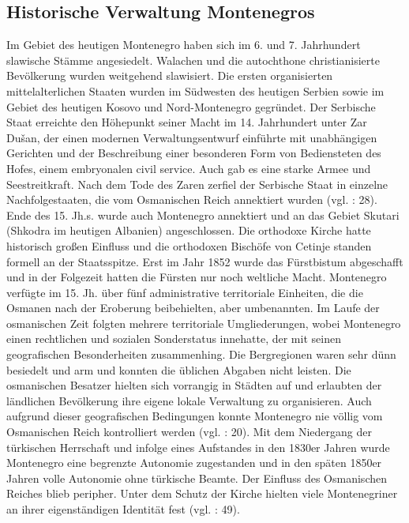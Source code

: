 \subsection{Historische Verwaltung Montenegros }
Im Gebiet des heutigen Montenegro haben sich im 6. und 7. Jahrhundert slawische Stämme angesiedelt. Walachen und die autochthone christianisierte Bevölkerung wurden weitgehend slawisiert. Die ersten organisierten mittelalterlichen Staaten wurden im Südwesten des heutigen Serbien sowie im Gebiet des heutigen Kosovo und Nord-Montenegro gegründet. Der Serbische Staat erreichte den Höhepunkt seiner Macht im 14. Jahrhundert unter Zar Dušan, der einen modernen Verwaltungsentwurf einführte mit unabhängigen Gerichten und der Beschreibung einer besonderen Form von Bediensteten des Hofes, einem embryonalen civil service. Auch gab es eine starke Armee und Seestreitkraft. Nach dem Tode des Zaren zerfiel der Serbische Staat in einzelne Nachfolgestaaten, die vom Osmanischen Reich annektiert wurden (vgl. \cite{beckm90} : 28). Ende des 15. Jh.s. wurde auch Montenegro annektiert und an das Gebiet Skutari (Shkodra im heutigen Albanien) angeschlossen. Die orthodoxe Kirche hatte historisch großen Einfluss und die orthodoxen Bischöfe von Cetinje standen formell an der Staatsspitze. Erst im Jahr 1852 wurde das Fürstbistum abgeschafft und in der Folgezeit hatten die Fürsten nur noch weltliche Macht. Montenegro verfügte im 15. Jh. über fünf administrative territoriale Einheiten, die die Osmanen nach der Eroberung beibehielten, aber umbenannten. Im Laufe der osmanischen Zeit folgten mehrere territoriale Umgliederungen, wobei Montenegro einen rechtlichen und sozialen Sonderstatus innehatte, der mit seinen geografischen Besonderheiten zusammenhing. Die Bergregionen waren sehr dünn besiedelt und arm und konnten die üblichen Abgaben nicht leisten. Die osmanischen Besatzer hielten sich vorrangig in Städten auf und erlaubten der ländlichen Bevölkerung ihre eigene lokale Verwaltung zu organisieren. Auch aufgrund dieser geografischen Bedingungen konnte Montenegro nie völlig vom Osmanischen Reich kontrolliert werden (vgl. \cite{boeck} : 20). Mit dem Niedergang der türkischen Herrschaft und infolge eines Aufstandes in den 1830er Jahren wurde Montenegro eine begrenzte Autonomie zugestanden und in den späten 1850er Jahren volle Autonomie ohne türkische Beamte. Der Einfluss des Osmanischen Reiches blieb peripher. Unter dem Schutz der Kirche hielten viele Montenegriner an ihrer eigenständigen Identität fest (vgl. \cite{sevic} : 49).\par

